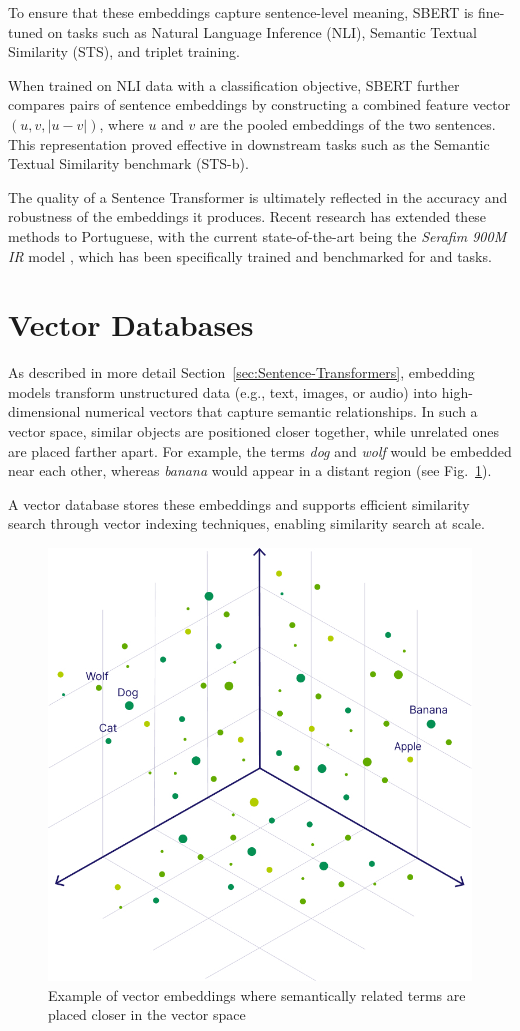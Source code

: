 To ensure that these embeddings capture sentence-level meaning, SBERT is fine-tuned on tasks such as Natural Language Inference (NLI), Semantic Textual Similarity (STS), and triplet training. 

When trained on NLI data with a classification objective, SBERT further compares pairs of sentence embeddings by constructing a combined feature vector $(u, v, |u-v|)$, where $u$ and $v$ are the pooled embeddings of the two sentences. This representation proved effective in downstream tasks such as the Semantic Textual Similarity benchmark (STS-b).

The quality of a Sentence Transformer is ultimately reflected in the accuracy and robustness of the embeddings it produces. Recent research has extended these methods to Portuguese, with the current state-of-the-art being the \textit{Serafim 900M IR} model \cite{gomes2024opensentenceembeddingsportuguese}, which has been specifically trained and benchmarked for  and  tasks.

\section{Vector Databases}
\label{sec:vector-store}
As described in more detail Section~\ref{sec:Sentence-Transformers}, embedding models transform unstructured data (e.g., text, images, or audio) into high-dimensional numerical vectors that capture semantic relationships. In such a vector space, similar objects are positioned closer together, while unrelated ones are placed farther apart. For example, the terms \emph{dog} and \emph{wolf} would be embedded near each other, whereas \emph{banana} would appear in a distant region (see Fig.~\ref{fig:vector-embedding}).  

A vector database stores these embeddings and supports efficient similarity search through vector indexing techniques, enabling similarity search at scale.
\begin{figure}[h]
    \centering
    \includegraphics[width=0.55\linewidth]{Images/vector-embedding.jpg}
    \caption{Example of vector embeddings where semantically related terms are placed closer in the vector space \cite{weaviate}}
    \label{fig:vector-embedding}
\end{figure}

